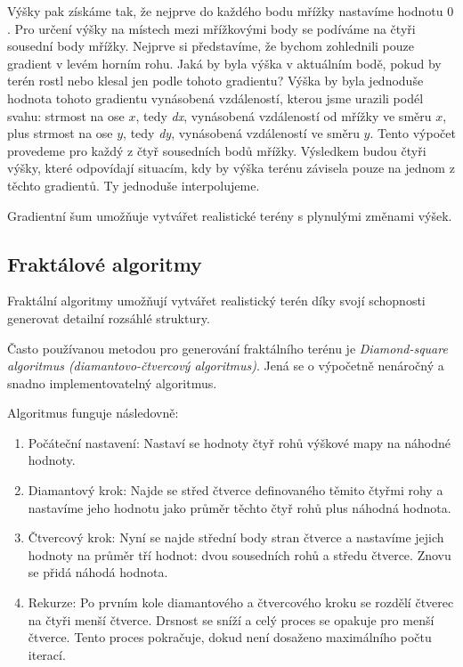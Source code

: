 Výšky pak získáme tak, že nejprve do každého bodu mřížky nastavíme hodnotu $0$. Pro určení výšky na místech mezi mřížkovými body se podíváme na čtyři sousední body mřížky. Nejprve si představíme, že bychom zohlednili pouze gradient v levém horním rohu. Jaká by byla výška v aktuálním bodě, pokud by terén rostl nebo klesal jen podle tohoto gradientu? Výška by byla jednoduše hodnota tohoto gradientu vynásobená vzdáleností, kterou jsme urazili podél svahu: strmost na ose $x$, tedy \textit{dx}, vynásobená vzdáleností od mřížky ve směru $x$, plus strmost na ose $y$, tedy \textit{dy}, vynásobená vzdáleností ve směru $y$. Tento výpočet provedeme pro každý z čtyř sousedních bodů mřížky. Výsledkem budou čtyři výšky, které odpovídají situacím, kdy by výška terénu závisela pouze na jednom z těchto gradientů. Ty jednoduše interpolujeme. \cite{perlinClanek}

Gradientní šum umožňuje vytvářet realistické terény s plynulými změnami výšek.


\subsection{Fraktálové algoritmy}

Fraktální algoritmy umožňují vytvářet realistický terén díky svojí schopnosti generovat detailní rozsáhlé struktury. 

Často používanou metodou pro generování fraktálního terénu je \textit{Diamond-square algoritmus (diamantovo-čtvercový algoritmus)}. Jená se o výpočetně nenáročný a snadno implementovatelný algoritmus. \cite{fracMath}

Algoritmus funguje následovně:
\begin{enumerate}
    \item Počáteční nastavení: Nastaví se hodnoty čtyř rohů výškové mapy na náhodné hodnoty.
    \item Diamantový krok: Najde se střed čtverce definovaného těmito čtyřmi rohy a nastavíme jeho hodnotu jako průměr těchto čtyř rohů plus náhodná hodnota.
    \item Čtvercový krok: Nyní se najde střední body stran čtverce a nastavíme jejich hodnoty na průměr tří hodnot: dvou sousedních rohů a středu čtverce. Znovu se přidá náhodá hodnota.
    \item Rekurze: Po prvním kole diamantového a čtvercového kroku se rozdělí čtverec na čtyři menší čtverce. Drsnost se sníží a celý proces se opakuje pro menší čtverce. Tento proces pokračuje, dokud není dosaženo maximálního počtu iterací.
\end{enumerate}

